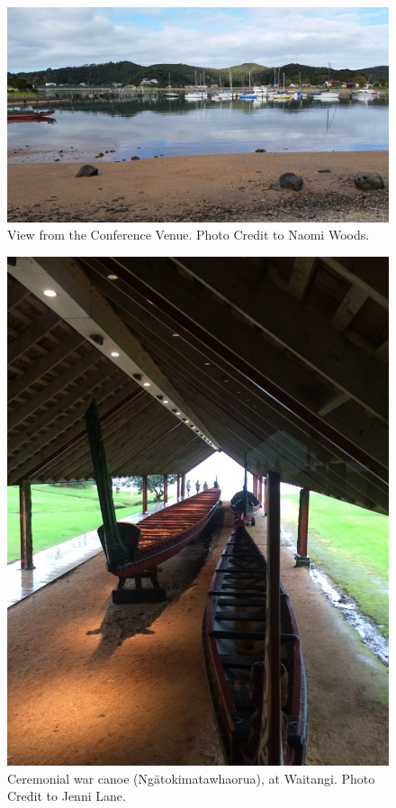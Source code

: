 	\begin{figure}
		\includegraphics[width=\linewidth]{figures/NZAA_Fig1.jpg}
		\centering
		\caption{View from the Conference Venue. Photo Credit to Naomi Woods.}
		\label{fig:NZAA_Fig1}
	\end{figure}
	\begin{figure}
		\includegraphics[width=\linewidth]{figures/NZAA_Fig2.jpg}
		\centering
		\caption{Ceremonial war canoe (Ngātokimatawhaorua), at Waitangi. Photo Credit to Jenni Lane.}
		\label{fig:NZAA_Fig2}
	\end{figure}
	
